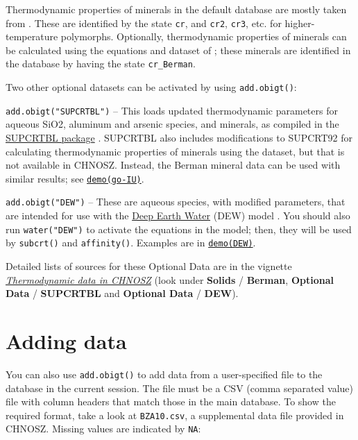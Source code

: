 \documentclass[]{tufte-book}
\begin{document}
Thermodynamic properties of minerals in the default database are mostly
taken from \citet{HDNB78}. These are identified by the state
\texttt{cr}, and \texttt{cr2}, \texttt{cr3}, etc. for higher-temperature
polymorphs. Optionally, thermodynamic properties of minerals can be
calculated using the equations and dataset of \citet{Ber88}; these
minerals are identified in the database by having the state
\texttt{cr\_Berman}.

Two other optional datasets can be activated by using
{\texttt{add.obigt()}}:

{\texttt{add.obigt("SUPCRTBL")}} -- This loads updated thermodynamic
parameters for aqueous SiO2, aluminum and arsenic species, and minerals,
as compiled in the
\href{http://www.indiana.edu/~hydrogeo/supcrtbl.html}{SUPCRTBL package}
\citep{ZZL_16}. SUPCRTBL also includes modifications to SUPCRT92 for
calculating thermodynamic properties of minerals using the \citet{HP11}
dataset, but that is not available in CHNOSZ. Instead, the Berman
mineral data can be used with similar results; see
\href{../demo}{{\texttt{demo(go-IU)}}}.

{\texttt{add.obigt("DEW")}} -- These are aqueous species, with modified
parameters, that are intended for use with the
\href{http://www.dewcommunity.org/}{Deep Earth Water} (DEW) model
\citep{SHA14}. You should also run {\texttt{water("DEW")}} to activate
the equations in the model; then, they will be used by
{\texttt{subcrt()}} and {\texttt{affinity()}}. Examples are in
\href{../demo}{{\texttt{demo(DEW)}}}.

Detailed lists of sources for these Optional Data are in the vignette
\href{obigt.html}{{\emph{Thermodynamic data in CHNOSZ}}} (look under
\textbf{Solids} / \textbf{Berman}, \textbf{Optional Data} /
\textbf{SUPCRTBL} and \textbf{Optional Data} / \textbf{DEW}).

\hypertarget{adding-data}{\section{Adding data}\label{adding-data}}

You can also use {\texttt{add.obigt()}} to add data from a
user-specified file to the database in the current session. The file
must be a CSV (comma separated value) file with column headers that
match those in the main database. To show the required format, take a
look at \texttt{BZA10.csv}, a supplemental data file provided in CHNOSZ.
Missing values are indicated by \texttt{NA}:
\end{document}
